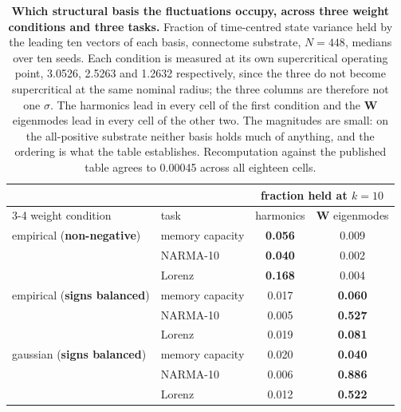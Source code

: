 \begin{table}[ht]
    \centering
    \caption[Which structural basis the fluctuations occupy]{\textbf{Which
    structural basis the fluctuations occupy, across three weight conditions and
    three tasks.} Fraction of time-centred state variance held by the leading
    ten vectors of each basis, connectome substrate,
    $N = 448$, %
    medians over ten seeds. Each condition is measured at its own supercritical
    operating point, 3.0526, 2.5263 and 1.2632 %
    respectively, since the three do not become supercritical at the same
    nominal radius; the three columns are therefore not one $\sigma$. The harmonics lead in every cell of the first condition and the $\mathbf{W}$ eigenmodes
    lead in every cell of the other two. The magnitudes are small: on the
    all-positive substrate neither basis holds much of anything, and the
    ordering is what the table establishes. Recomputation against the published table
    agrees to 0.00045 %
    across all eighteen cells.}
    \label{tab:app-basis}
    \begin{tabular}{llcc}
        \toprule
        & & \multicolumn{2}{c}{fraction held at $k = 10$} \\
        \cmidrule(lr){3-4}
        weight condition & task & harmonics & $\mathbf{W}$ eigenmodes \\
        \midrule
        empirical (\textbf{non-negative}) & memory capacity & \textbf{0.056} & 0.009 \\ %
        & NARMA-10 & \textbf{0.040} & 0.002 \\ %
        & Lorenz & \textbf{0.168} & 0.004 \\ %
        \addlinespace
        empirical (\textbf{signs balanced}) & memory capacity & 0.017 & \textbf{0.060} \\ %
        & NARMA-10 & 0.005 & \textbf{0.527} \\ %
        & Lorenz & 0.019 & \textbf{0.081} \\ %
        \addlinespace
        gaussian (\textbf{signs balanced}) & memory capacity & 0.020 & \textbf{0.040} \\ %
        & NARMA-10 & 0.006 & \textbf{0.886} \\ %
        & Lorenz & 0.012 & \textbf{0.522} \\ %
        \bottomrule
    \end{tabular}
\end{table}

